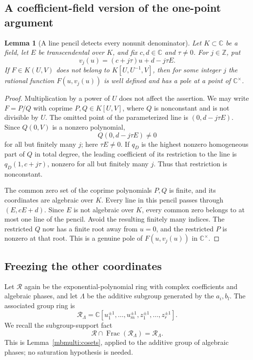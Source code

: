 \documentclass[11pt]{article}
\newtheorem{lemma}[theorem]{Lemma}
\theoremstyle{definition}
\theoremstyle{remark}
\begin{document}
\subsection{A coefficient-field version of the one-point argument}

\begin{lemma}[A line pencil detects every nonunit denominator]
\label{ner:pencil}
Let $K\subset\mathbb C$ be a field, let $E$ be transcendental
over $K$, and fix $c,d\in\mathbb C$ and $\tau\ne0$.
For $j\in\mathbb Z$, put
\[
 v_j(u)=(c+j\tau)u+d-j\tau E.
\]
If $F\in K(U,V)$ does not belong to $K[U,U^{-1},V]$,
then for some integer $j$ the rational function $F(u,v_j(u))$
is well defined and has a pole at a point of $\mathbb C^\times$.
\end{lemma}
\begin{proof}
Multiplication by a power of $U$ does not affect the assertion.
We may write $F=P/Q$ with coprime $P,Q\in K[U,V]$, where
$Q$ is nonconstant and is not divisible by $U$.
The omitted point of the parameterized line is
$(0,d-j\tau E)$.  Since $Q(0,V)$ is a nonzero polynomial,
\[
 Q(0,d-j\tau E)\ne0
\]
for all but finitely many $j$; here $\tau E\ne0$.
If $q_D$ is the highest nonzero homogeneous part of $Q$ in
total degree, the leading coefficient of its restriction to
the line is $q_D(1,c+j\tau)$, nonzero for all but finitely
many $j$.  Thus that restriction is nonconstant.

The common zero set of the coprime polynomials $P,Q$ is finite,
and its coordinates are algebraic over $K$.  Every line in
this pencil passes through $(E,cE+d)$.  Since $E$ is not
algebraic over $K$, every common zero belongs to at most one
line of the pencil.  Avoid the resulting finitely many indices.
The restricted $Q$ now has a finite root away from $u=0$,
and the restricted $P$ is nonzero at that root.  This is a
genuine pole of $F(u,v_j(u))$ in $\mathbb C^\times$.
\end{proof}

\subsection{Freezing the other coordinates}

Let $\mathcal R$ again be the exponential-polynomial ring with
complex coefficients and algebraic phases, and let $\Lambda$
be the additive subgroup generated by the $a_i,b_l$.
The associated group ring is
\[
 \mathcal R_\Lambda
       =\mathbb C[u_1^{\pm1},\ldots,u_m^{\pm1},
                                z_1^{\pm1},\ldots,z_r^{\pm1}].
\]
We recall the subgroup-support fact
\begin{equation}\label{ner:coset}
 \mathcal R\cap\operatorname{Frac}(\mathcal R_\Lambda)
       =\mathcal R_\Lambda.
\end{equation}
This is Lemma~\ref{mbmulti:cosets}, applied to the additive group
of algebraic phases; no saturation hypothesis is needed.
\end{document}
